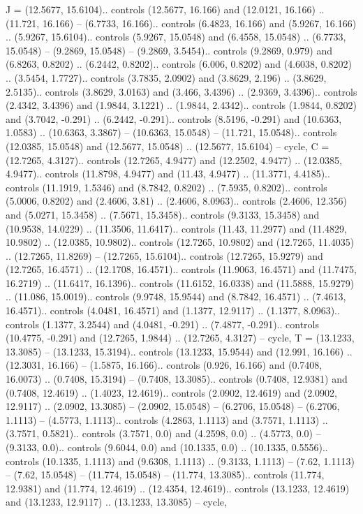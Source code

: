 {J} = {(12.5677, 15.6104).. controls (12.5677, 16.166) and (12.0121, 16.166) .. (11.721, 16.166) -- (6.7733, 16.166).. controls (6.4823, 16.166) and (5.9267, 16.166) .. (5.9267, 15.6104).. controls (5.9267, 15.0548) and (6.4558, 15.0548) .. (6.7733, 15.0548) -- (9.2869, 15.0548) -- (9.2869, 3.5454).. controls (9.2869, 0.979) and (6.8263, 0.8202) .. (6.2442, 0.8202).. controls (6.006, 0.8202) and (4.6038, 0.8202) .. (3.5454, 1.7727).. controls (3.7835, 2.0902) and (3.8629, 2.196) .. (3.8629, 2.5135).. controls (3.8629, 3.0163) and (3.466, 3.4396) .. (2.9369, 3.4396).. controls (2.4342, 3.4396) and (1.9844, 3.1221) .. (1.9844, 2.4342).. controls (1.9844, 0.8202) and (3.7042, -0.291) .. (6.2442, -0.291).. controls (8.5196, -0.291) and (10.6363, 1.0583) .. (10.6363, 3.3867) -- (10.6363, 15.0548) -- (11.721, 15.0548).. controls (12.0385, 15.0548) and (12.5677, 15.0548) .. (12.5677, 15.6104) -- cycle},
{C} = {(12.7265, 4.3127).. controls (12.7265, 4.9477) and (12.2502, 4.9477) .. (12.0385, 4.9477).. controls (11.8798, 4.9477) and (11.43, 4.9477) .. (11.3771, 4.4185).. controls (11.1919, 1.5346) and (8.7842, 0.8202) .. (7.5935, 0.8202).. controls (5.0006, 0.8202) and (2.4606, 3.81) .. (2.4606, 8.0963).. controls (2.4606, 12.356) and (5.0271, 15.3458) .. (7.5671, 15.3458).. controls (9.3133, 15.3458) and (10.9538, 14.0229) .. (11.3506, 11.6417).. controls (11.43, 11.2977) and (11.4829, 10.9802) .. (12.0385, 10.9802).. controls (12.7265, 10.9802) and (12.7265, 11.4035) .. (12.7265, 11.8269) -- (12.7265, 15.6104).. controls (12.7265, 15.9279) and (12.7265, 16.4571) .. (12.1708, 16.4571).. controls (11.9063, 16.4571) and (11.7475, 16.2719) .. (11.6417, 16.1396).. controls (11.6152, 16.0338) and (11.5888, 15.9279) .. (11.086, 15.0019).. controls (9.9748, 15.9544) and (8.7842, 16.4571) .. (7.4613, 16.4571).. controls (4.0481, 16.4571) and (1.1377, 12.9117) .. (1.1377, 8.0963).. controls (1.1377, 3.2544) and (4.0481, -0.291) .. (7.4877, -0.291).. controls (10.4775, -0.291) and (12.7265, 1.9844) .. (12.7265, 4.3127) -- cycle},
{T} = {(13.1233, 13.3085) -- (13.1233, 15.3194).. controls (13.1233, 15.9544) and (12.991, 16.166) .. (12.3031, 16.166) -- (1.5875, 16.166).. controls (0.926, 16.166) and (0.7408, 16.0073) .. (0.7408, 15.3194) -- (0.7408, 13.3085).. controls (0.7408, 12.9381) and (0.7408, 12.4619) .. (1.4023, 12.4619).. controls (2.0902, 12.4619) and (2.0902, 12.9117) .. (2.0902, 13.3085) -- (2.0902, 15.0548) -- (6.2706, 15.0548) -- (6.2706, 1.1113) -- (4.5773, 1.1113).. controls (4.2863, 1.1113) and (3.7571, 1.1113) .. (3.7571, 0.5821).. controls (3.7571, 0.0) and (4.2598, 0.0) .. (4.5773, 0.0) -- (9.3133, 0.0).. controls (9.6044, 0.0) and (10.1335, 0.0) .. (10.1335, 0.5556).. controls (10.1335, 1.1113) and (9.6308, 1.1113) .. (9.3133, 1.1113) -- (7.62, 1.1113) -- (7.62, 15.0548) -- (11.774, 15.0548) -- (11.774, 13.3085).. controls (11.774, 12.9381) and (11.774, 12.4619) .. (12.4354, 12.4619).. controls (13.1233, 12.4619) and (13.1233, 12.9117) .. (13.1233, 13.3085) -- cycle},
